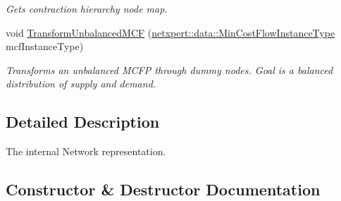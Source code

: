 \begin{DoxyCompactItemize}
\begin{DoxyCompactList}\small\item\em Gets contraction hierarchy node map. \end{DoxyCompactList}\item 
void \hyperlink{classnetxpert_1_1InternalNet_ab34466537d05108f22413a427f37e8b1}{Transform\+Unbalanced\+M\+CF} (\hyperlink{namespacenetxpert_1_1data_a9504ea932b3debceb4ba7f6831e80bbd}{netxpert\+::data\+::\+Min\+Cost\+Flow\+Instance\+Type} mcf\+Instance\+Type)\hypertarget{classnetxpert_1_1InternalNet_ab34466537d05108f22413a427f37e8b1}{}\label{classnetxpert_1_1InternalNet_ab34466537d05108f22413a427f37e8b1}

\begin{DoxyCompactList}\small\item\em Transforms an unbalanced M\+C\+FP through dummy nodes. Goal is a balanced distribution of supply and demand. \end{DoxyCompactList}\end{DoxyCompactItemize}


\subsection{Detailed Description}
The internal Network representation. 

\subsection{Constructor \& Destructor Documentation}

